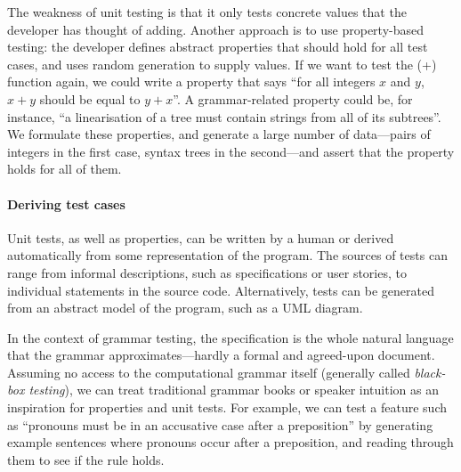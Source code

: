The weakness of unit testing is that it only tests concrete values
that the developer has thought of adding. Another approach is to use
property-based testing: the developer defines abstract properties that
should hold for all test cases, and uses random generation to supply
values. If we want to test the (+) function again, we could write a
property that says ``for all integers $x$ and $y$, $x+y$ should be
equal to $y+x$''.  A grammar-related property could be, for instance,
``a linearisation of a tree must contain strings from all of its
subtrees''.  We formulate these properties, and generate a large
number of data---pairs of integers in the first case, syntax trees in
the second---and assert that the property holds for all of them.



\paragraph{Deriving test cases}

Unit tests, as well as properties, can be written by a human or
derived automatically from some representation of the program. The
sources of tests can range from informal descriptions, such as
specifications or user stories, to individual statements in the source
code. Alternatively, tests can be generated from an abstract model of
the program, such as a UML diagram.

In the context of grammar testing, the specification is the whole
natural language that the grammar approximates---hardly a formal and
agreed-upon document. Assuming no access to the computational grammar
itself (generally called \emph{black-box testing}), we can treat traditional
grammar books or speaker intuition as an inspiration for properties
and unit tests. For example, we can test a feature such as ``pronouns
must be in an accusative case after a preposition'' by generating
example sentences where pronouns occur after a preposition, and
reading through them to see if the rule holds.

